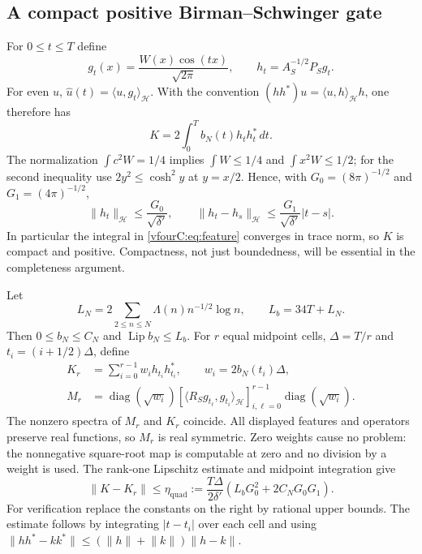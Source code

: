 \documentclass[11pt,a4paper]{article}
\numberwithin{equation}{section}
\theoremstyle{definition}\newtheorem{definition}[theorem]{Definition}
\theoremstyle{remark}\newtheorem{remark}[theorem]{Remark}
\newcommand{\Hh}{\mathcal H}\newcommand{\Hw}{\mathcal H}
\newcommand{\ip}[2]{\langle#1,#2\rangle}\newcommand{\norm}[1]{\lVert#1\rVert}\newcommand{\abs}[1]{\lvert#1\rvert}
\begin{document}
\subsection{A compact positive Birman--Schwinger gate}
\label{vfourC:subsec:matrix}

For $0\le t\le T$ define
\[
 g_t(x)=\frac{W(x)\cos(tx)}{\sqrt{2\pi}},\qquad
 h_t=A_S^{-1/2}P_Sg_t.
\]
For even $u$, $\widehat u(t)=\ip{u}{g_t}_{\Hh}$.  With the convention
$(hh^*)u=\ip{u}{h}_{\Hh}h$, one therefore has
\begin{equation}\label{vfourC:eq:feature}
 K=2\int_0^T b_N(t)h_th_t^*\,dt.
\end{equation}
The normalization $\int c^2W=1/4$ implies
$\int W\le1/4$ and $\int x^2W\le1/2$; for the second inequality use
$2y^2\le\cosh^2y$ at $y=x/2$.  Hence, with
$G_0=(8\pi)^{-1/2}$ and $G_1=(4\pi)^{-1/2}$,
\begin{equation}\label{vfourC:eq:feature-bounds}
 \norm{h_t}_{\Hh}\le\frac{G_0}{\sqrt{\delta'}},\qquad
 \norm{h_t-h_s}_{\Hh}\le\frac{G_1}{\sqrt{\delta'}}|t-s|.
\end{equation}
In particular the integral in \eqref{vfourC:eq:feature} converges in trace norm,
so $K$ is compact and positive.  Compactness, not just boundedness, will be
essential in the completeness argument.

Let
\[
 L_N=2\sum_{2\le n\le N}\Lambda(n)n^{-1/2}\log n,
 \qquad L_b=34T+L_N.
\]
Then $0\le b_N\le C_N$ and $\operatorname{Lip}b_N\le L_b$.  For $r$ equal
midpoint cells, $\Delta=T/r$ and $t_i=(i+1/2)\Delta$, define
\begin{align}
 K_r&=\sum_{i=0}^{r-1}w_i h_{t_i}h_{t_i}^*,
       \qquad w_i=2b_N(t_i)\Delta,\label{vfourC:eq:finite-K}\\
 M_r&=\operatorname{diag}(\sqrt{w_i})
     [\ip{R_Sg_{t_\ell}}{g_{t_i}}_{\Hh}]_{i,\ell=0}^{r-1}
       \operatorname{diag}(\sqrt{w_i}).\label{vfourC:eq:finite-M}
\end{align}
The nonzero spectra of $M_r$ and $K_r$ coincide.  All displayed features and
operators preserve real functions, so $M_r$ is real symmetric.  Zero weights
cause no problem: the nonnegative square-root map is computable at zero and
no division by a weight is used.  The rank-one Lipschitz estimate and midpoint
integration give
\begin{equation}\label{vfourC:eq:quadrature}
 \norm{K-K_r}\le\eta_{\mathrm{quad}}
 :=\frac{T\Delta}{2\delta'}
       (L_bG_0^2+2C_NG_0G_1).
\end{equation}
For verification replace the constants on the right by rational upper bounds.
The estimate follows by integrating $|t-t_i|$ over each cell and using
$\norm{hh^*-kk^*}\le(\norm h+\norm k)\norm{h-k}$.
\end{document}
